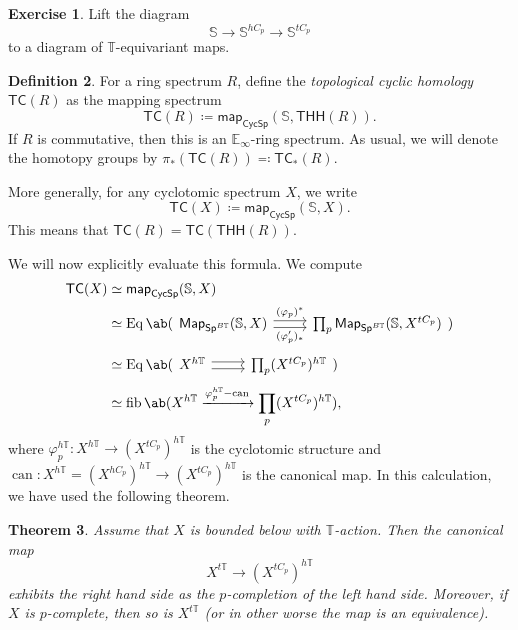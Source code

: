\documentclass[10pt, oneside]{memoir}
\newtheorem{thm}{Theorem}[subsection]
\theoremstyle{definition}
\newtheorem{defn}[thm]{Definition}
\newtheorem{exer}[thm]{Exercise}
\theoremstyle{remark}
\theoremstyle{plain}
\theoremstyle{definition}
\theoremstyle{remark}
\newcommand{\E}{\mathbb{E}}
\newcommand{\bS}{\mathbb{S}}
\newcommand{\T}{\mathbb{T}}
\newcommand{\mr}[1]{\mathrm{#1}}
\newcommand{\on}[1]{\operatorname{#1}}
\newcommand{\ms}[1]{\mathsf{#1}}
\newcommand{\1}{\mathbf{1}}
\newcommand{\2}{\mathbf{2}}
\newcommand{\3}{\mathbf{3}}
\newcommand{\THH}{\ms{THH}}
\newcommand{\TC}{\ms{TC}}
\begin{document}
\begin{exer}
    Lift the diagram
    \[ \bS \to \bS^{hC_p} \to \bS^{tC_p} \]
    to a diagram of $\T$-equivariant maps.
\end{exer}

\begin{defn}
    For a ring spectrum $R$, define the \textit{topological cyclic homology} $\TC(R)$ as the mapping spectrum
    \[ \TC(R) \coloneqq \ms{map}_{\ms{CycSp}}(\bS, \THH(R)). \]
    If $R$ is commutative, then this is an $\E_{\infty}$-ring spectrum. As usual, we will denote the homotopy groups by $\pi_*(\TC(R)) \eqqcolon \TC_*(R)$.

    More generally, for any cyclotomic spectrum $X$, we write
    \[ \TC(X) \coloneqq \ms{map}_{\ms{CycSp}}(\bS, X). \]
    This means that $\TC(R) = \TC(\THH(R))$.
\end{defn}

We will now explicitly evaluate this formula. We compute
\begin{align*}
    \TC(X) &\simeq \ms{map}_{\ms{CycSp}}(\bS, X) \\ 
    &\simeq \on{Eq} \ab(\begin{tikzcd}[ampersand replacement=\&]
        \ms{Map}_{\ms{Sp}^{B\T}}(\bS,X) \ar[shift left=1]{r}{(\varphi_p)^*} \ar[shift right=1]{r}[swap]{(\varphi_p')_*} \& \prod_p \ms{Map}_{\ms{Sp}^{B\T}}(\bS, X^{tC_p})
    \end{tikzcd}) \\
    &\simeq \on{Eq} \ab(\begin{tikzcd}[ampersand replacement=\&]
        X^{h\T} \ar[shift left=1]{r} \ar[shift right=1]{r} \& \prod_p (X^{tC_p})^{h\T}
    \end{tikzcd}) \\
    &\simeq \on{fib} \ab(X^{h\T} \xrightarrow{\varphi_p^{h\T}-\mr{can}} \prod_p (X^{tC_p})^{h\T}),
\end{align*}
where $\varphi_p^{h\T} \colon X^{h\T} \to (X^{tC_p})^{h\T}$ is the cyclotomic structure and $\on{can} \colon X^{h\T} = (X^{hC_p})^{h\T} \to (X^{tC_p})^{h\T}$
is the canonical map. In this calculation, we have used the following theorem.

\begin{thm}\label{thm:ns}
    Assume that $X$ is bounded below with $\T$-action. Then the canonical map
    \[ X^{t\T} \to (X^{tC_p})^{h\T} \]
    exhibits the right hand side as the $p$-completion of the left hand side. Moreover, if $X$ is $p$-complete, then so is $X^{t\T}$ (or in other worse the map is an equivalence).
\end{thm}
\end{document}

